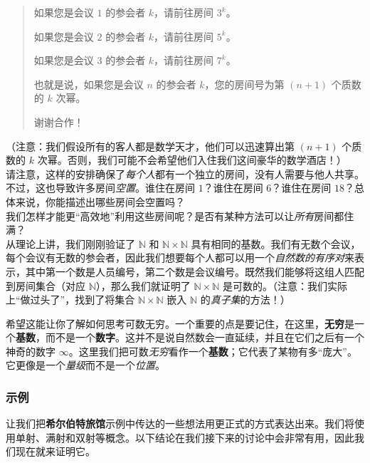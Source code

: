 \begin{itemize}
\begin{quotation}
              如果您是会议 $1$ 的参会者 $k$，请前往房间 $3^k$。

              如果您是会议 $2$ 的参会者 $k$，请前往房间 $5^k$。

              如果您是会议 $3$ 的参会者 $k$，请前往房间 $7^k$。

              也就是说，如果您是会议 $n$ 的参会者 $k$，您的房间号为第 $(n+1)$ 个质数的 $k$ 次幂。

              谢谢合作！
          \end{quotation}
          （注意：我们假设所有的客人都是数学天才，他们可以迅速算出第 $(n + 1)$ 个质数的 $k$ 次幂。否则，我们可能不会希望他们入住我们这间豪华的数学酒店！）\\

          请注意，这样的安排确保了\emph{每个人}都有一个独立的房间，没有人需要与他人共享。不过，这也导致许多房间\emph{空置}。谁住在房间 $1$？谁住在房间 $6$？谁住在房间 $18$？总体来说，你能描述出哪些房间会空置吗？\\

          我们怎样才能更``高效地''利用这些房间呢？是否有某种方法可以让\emph{所有}房间都住满？\\

          从理论上讲，我们刚刚验证了 $\mathbb{N}$ 和 $\mathbb{N} \times \mathbb{N}$ 具有相同的基数。我们有无数个会议，每个会议有无数的参会者，因此我们想要每个人都可以用一个\emph{自然数的有序对}来表示，其中第一个数是人员编号，第二个数是会议编号。既然我们能够将这组人匹配到房间集合（对应 $\mathbb{N}$），那么我们就证明了 $\mathbb{N} \times \mathbb{N}$ 是可数的。（注意：我们实际上``做过头了''，找到了将集合 $\mathbb{N} \times \mathbb{N}$ 嵌入 $\mathbb{N}$ 的\emph{真子集}的方法！）\\
\end{itemize}

希望这能让你了解如何思考可数无穷。一个重要的点是要记住，在这里，\textbf{无穷}是一个\textbf{基数}，而不是一个\textbf{数字}。这并不是说自然数会一直延续，并且在它们之后有一个神奇的数字 $\infty$。这里我们把可数\emph{无穷}看作一个\textbf{基数}；它代表了某物有多``庞大''。它更像是一个\emph{量级}而不是一个\emph{位置}。

\subsubsection*{示例}

让我们把\textbf{希尔伯特旅馆}示例中传达的一些想法用更正式的方式表达出来。我们将使用单射、满射和双射等概念。以下结论在我们接下来的讨论中会非常有用，因此我们现在就来证明它。

